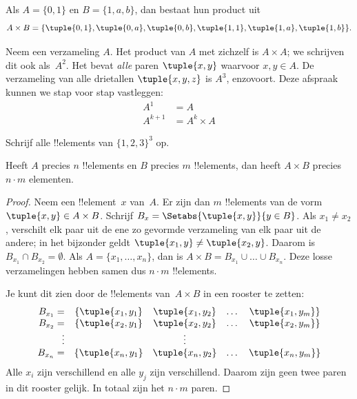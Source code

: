 \documentclass[../../../include/open-logic-section]{subfiles}
\begin{document}
\begin{ex}
Als $A = \{0, 1\}$ en $B = \{1, a, b\}$, dan bestaat hun product uit
\[
A \times B = \{ \tuple{0, 1}, \tuple{0, a}, \tuple{0, b},
    \tuple{1, 1}, \tuple{1, a}, \tuple{1, b} \}.
\]
\end{ex}

\begin{ex}
Neem een verzameling $A$. Het product van $A$ met zichzelf is $A
\times A$; we schrijven dit ook als~$A^2$. Het bevat \emph{alle}
paren $\tuple{x, y}$ waarvoor $x, y \in A$. De verzameling van alle
drietallen $\tuple{x, y, z}$ is $A^3$, enzovoort. Deze afspraak kunnen
we stap voor stap vastleggen:
\begin{align*}
  A^1 & = A\\
  A^{k+1} & = A^k \times A
\end{align*}
\end{ex}

\begin{prob}
Schrijf alle !!{element}s van $\{1, 2, 3\}^3$ op.
\end{prob}

\begin{prop}
Heeft $A$ precies $n$ !!{element}s en $B$ precies $m$ !!{element}s,
dan heeft $A \times B$ precies $n\cdot m$ elementen.
\end{prop}

\begin{proof}
Neem een !!{element}~$x$ van~$A$. Er zijn dan $m$ !!{element}s van de
vorm $\tuple{x, y} \in A \times B$. Schrijf $B_x =
\Setabs{\tuple{x, y}}{y \in B}$. Als $x_1 \neq x_2$, verschilt elk
paar uit de ene zo gevormde verzameling van elk paar uit de andere; in het bijzonder geldt
$\tuple{x_1, y} \neq \tuple{x_2, y}$. Daarom is $B_{x_1} \cap B_{x_2}
= \emptyset$. Als $A = \{x_1, \dots, x_n\}$, dan is $A \times B =
B_{x_1} \cup \dots \cup B_{x_n}$. Deze losse verzamelingen hebben
samen dus $n\cdot m$ !!{element}s.

Je kunt dit zien door de !!{element}s van~$A \times B$ in een rooster
te zetten:
\[
\begin{array}{rcccc}
  B_{x_1} = & \{\tuple{x_1, y_1} & \tuple{x_1, y_2} & \dots & \tuple{x_1, y_m}\}\\
  B_{x_2} = & \{\tuple{x_2, y_1} & \tuple{x_2, y_2} & \dots & \tuple{x_2, y_m}\}\\
  \vdots & & \vdots\\
  B_{x_n} = & \{\tuple{x_n, y_1} & \tuple{x_n, y_2} & \dots & \tuple{x_n, y_m}\}
\end{array}
\]
Alle $x_i$ zijn verschillend en alle $y_j$ zijn verschillend. Daarom
zijn geen twee paren in dit rooster gelijk. In totaal zijn het
$n\cdot m$ paren.
\end{proof}
\end{document}
